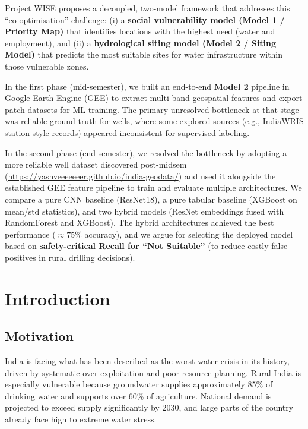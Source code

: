 \documentclass[12pt,a4paper]{report}
\begin{document}
Project WISE proposes a decoupled, two-model framework that addresses this “co-optimisation” challenge: (i) a \textbf{social vulnerability model (Model 1 / Priority Map)} that identifies locations with the highest need (water and employment), and (ii) a \textbf{hydrological siting model (Model 2 / Siting Model)} that predicts the most suitable sites for water infrastructure within those vulnerable zones.

In the first phase (mid-semester), we built an end-to-end \textbf{Model 2} pipeline in Google Earth Engine (GEE) to extract multi-band geospatial features and export patch datasets for ML training. The primary unresolved bottleneck at that stage was reliable ground truth for wells, where some explored sources (e.g., IndiaWRIS station-style records) appeared inconsistent for supervised labeling.

In the second phase (end-semester), we resolved the bottleneck by adopting a more reliable well dataset discovered post-midsem (\url{https://yashveeeeeeer.github.io/india-geodata/}) and used it alongside the established GEE feature pipeline to train and evaluate multiple architectures. We compare a pure CNN baseline (ResNet18), a pure tabular baseline (XGBoost on mean/std statistics), and two hybrid models (ResNet embeddings fused with RandomForest and XGBoost). The hybrid architectures achieved the best performance (\(\approx 75\%\) accuracy), and we argue for selecting the deployed model based on \textbf{safety-critical Recall for ``Not Suitable''} (to reduce costly false positives in rural drilling decisions).

\clearpage
{}


\chapter{Introduction}

\section{Motivation}
India is facing what has been described as the worst water crisis in its history, driven by systematic over-exploitation and poor resource planning. Rural India is especially vulnerable because groundwater supplies approximately 85\% of drinking water and supports over 60\% of agriculture. National demand is projected to exceed supply significantly by 2030, and large parts of the country already face high to extreme water stress.
\end{document}

